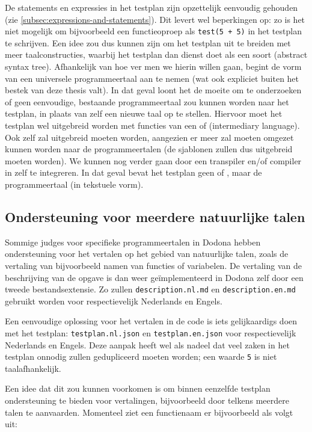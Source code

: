 De statements en expressies in het testplan zijn opzettelijk eenvoudig gehouden (zie \cref{subsec:expressions-and-statements}).
Dit levert wel beperkingen op: zo is het niet mogelijk om bijvoorbeeld een functieoproep als \texttt{test(5 + 5)} in het testplan te schrijven.
Een idee zou dus kunnen zijn om het testplan uit te breiden met meer taalconstructies, waarbij het testplan dan dienst doet als een soort  (abstract syntax tree).
Afhankelijk van hoe ver men we hierin willen gaan, begint de vorm van een universele programmeertaal aan te nemen (wat ook expliciet buiten het bestek van deze thesis valt).
In dat geval loont het de moeite om te onderzoeken of geen eenvoudige, bestaande programmeertaal  zou kunnen worden naar het testplan, in plaats van zelf een nieuwe taal op te stellen.
Hiervoor moet het testplan wel uitgebreid worden met functies van een  of  (intermediary language).
Ook \tested{} zelf zal uitgebreid moeten worden, aangezien er meer zal moeten omgezet kunnen worden naar de programmeertalen (de sjablonen zullen dus uitgebreid moeten worden).
We kunnen nog verder gaan door een transpiler en/of compiler in \tested{} zelf te integreren.
In dat geval bevat het testplan geen  of , maar de programmeertaal (in tekstuele vorm).

\subsection{Ondersteuning voor meerdere natuurlijke talen}\label{subsec:ondersteuning-voor-natuurlijke-talen}

Sommige judges voor specifieke programmeertalen in Dodona hebben ondersteuning voor het vertalen op het gebied van natuurlijke talen, zoals de vertaling van bijvoorbeeld namen van functies of variabelen.
De vertaling van de beschrijving van de opgave is dan weer geïmplementeerd in Dodona zelf door een tweede bestandsextensie.
Zo zullen \texttt{description.nl.md} en \texttt{description.en.md} gebruikt worden voor respectievelijk Nederlands en Engels.

Een eenvoudige oplossing voor het vertalen in de code is iets gelijkaardigs doen met het testplan: \texttt{testplan.nl.json} en \texttt{testplan.en.json} voor respectievelijk Nederlands en Engels.
Deze aanpak heeft wel als nadeel dat veel zaken in het testplan onnodig zullen gedupliceerd moeten worden;
een waarde \texttt{5} is niet taalafhankelijk.

Een idee dat dit zou kunnen voorkomen is om binnen eenzelfde testplan ondersteuning te bieden voor vertalingen, bijvoorbeeld door telkens meerdere talen te aanvaarden.
Momenteel ziet een functienaam er bijvoorbeeld als volgt uit:

